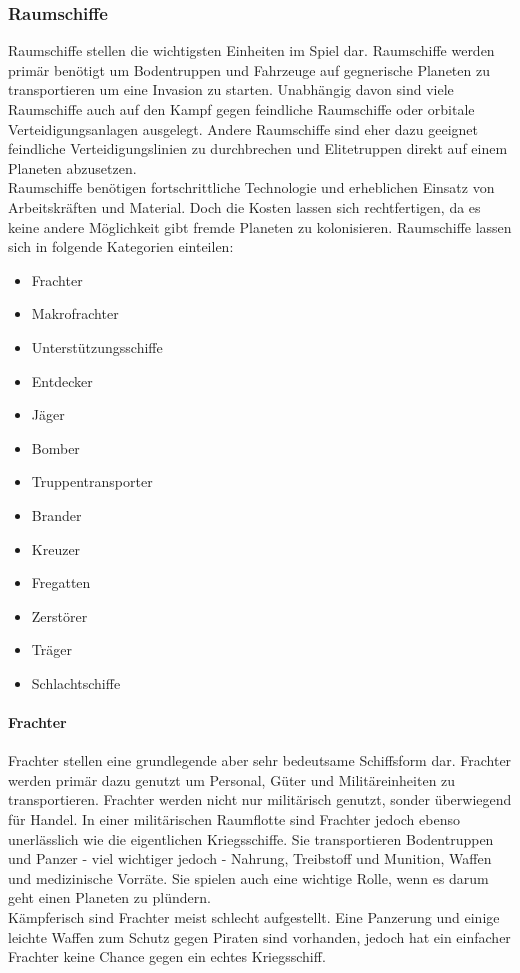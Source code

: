 \documentclass[11pt, a4paper]{article}
\begin{document}
\subsubsection{Raumschiffe}
Raumschiffe stellen die wichtigsten Einheiten im Spiel dar. Raumschiffe werden primär benötigt um Bodentruppen
und Fahrzeuge auf gegnerische Planeten zu transportieren um eine Invasion zu starten. Unabhängig davon sind
viele Raumschiffe auch auf den Kampf gegen feindliche Raumschiffe oder orbitale Verteidigungsanlagen
ausgelegt. Andere Raumschiffe sind eher dazu geeignet feindliche Verteidigungslinien zu durchbrechen und
Elitetruppen direkt auf einem Planeten abzusetzen.\\
Raumschiffe benötigen fortschrittliche Technologie und erheblichen Einsatz von Arbeitskräften und Material.
Doch die Kosten lassen sich rechtfertigen, da es keine andere Möglichkeit gibt fremde Planeten zu kolonisieren.
Raumschiffe lassen sich in folgende Kategorien einteilen:
\begin{itemize}
	\item Frachter
	\item Makrofrachter
	\item Unterstützungsschiffe
	\item Entdecker
	\item Jäger
    \item Bomber
    \item Truppentransporter
	\item Brander
	\item Kreuzer
	\item Fregatten
	\item Zerstörer
	\item Träger
	\item Schlachtschiffe
\end{itemize}
%
\paragraph{Frachter}
Frachter stellen eine grundlegende aber sehr bedeutsame Schiffsform dar. Frachter werden primär dazu genutzt
um Personal, Güter und Militäreinheiten zu transportieren. Frachter werden nicht nur militärisch genutzt,
sonder überwiegend für Handel. In einer militärischen Raumflotte sind Frachter jedoch ebenso unerlässlich wie
die eigentlichen Kriegsschiffe. Sie transportieren Bodentruppen und Panzer - viel wichtiger jedoch -
Nahrung, Treibstoff und Munition, Waffen und medizinische Vorräte. Sie spielen auch eine wichtige Rolle, wenn
es darum geht einen Planeten zu plündern.\\
Kämpferisch sind Frachter meist schlecht aufgestellt. Eine Panzerung und einige leichte Waffen zum Schutz
gegen Piraten sind vorhanden, jedoch hat ein einfacher Frachter keine Chance gegen ein echtes Kriegsschiff.
%
\end{document}
